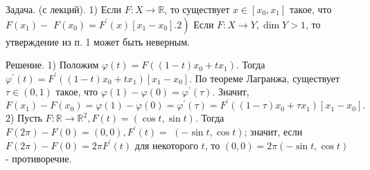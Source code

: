 \begin{task}
    Задача. (с лекций). 1) Если $F: X \rightarrow \mathbb{R}$, то существует $x \in\left[x_0, x_1\right]$ такое, что $F\left(x_1\right)-$ $\left.F\left(x_0\right)=F^{\prime}(x)\left[x_1-x_0\right] .2\right)$ Если $F: X \rightarrow Y, \operatorname{dim} Y>1$, то утверждение из п. 1 может быть неверным.
    
    Решение. 1) Положим $\varphi(t)=F\left((1-t) x_0+t x_1\right)$. Тогда $\varphi^{\prime}(t)=F^{\prime}\left((1-t) x_0+t x_1\right)\left[x_1-x_0\right]$. По теореме Лагранжа, существует $\tau \in(0,1)$ такое, что $\varphi(1)-\varphi(0)=\varphi^{\prime}(\tau)$. Значит,
    $$
    F\left(x_1\right)-F\left(x_0\right)=\varphi(1)-\varphi(0)=\varphi^{\prime}(\tau)=F^{\prime}\left((1-\tau) x_0+\tau x_1\right)\left[x_1-x_0\right] .
    $$
    2) Пусть $F: \mathbb{R} \rightarrow \mathbb{R}^2, F(t)=(\cos t, \sin t)$. Тогда $F(2 \pi)-F(0)=(0,0), F^{\prime}(t)=$ $(-\sin t, \cos t)$; значит, если $F(2 \pi)-F(0)=2 \pi F^{\prime}(t)$ для некоторого $t$, то $(0,0)=2 \pi(-\sin t, \cos t)$ - противоречие.
    
\end{task}